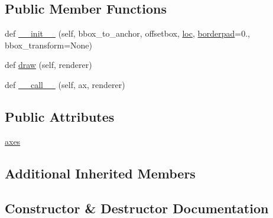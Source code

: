 \subsection*{Public Member Functions}
\begin{DoxyCompactItemize}
\item 
def \hyperlink{classaxes__grid1_1_1inset__locator_1_1AnchoredLocatorBase_a8a4b20f4feabb4c4cab5f5c4af129f5b}{\+\_\+\+\_\+init\+\_\+\+\_\+} (self, bbox\+\_\+to\+\_\+anchor, offsetbox, \hyperlink{classmatplotlib_1_1offsetbox_1_1AnchoredOffsetbox_acff8512cc529c0576658d3d3102f68ad}{loc}, \hyperlink{classmatplotlib_1_1offsetbox_1_1AnchoredOffsetbox_a50d24143d0fabb11a481b3d85b62a19a}{borderpad}=0., bbox\+\_\+transform=None)
\item 
def \hyperlink{classaxes__grid1_1_1inset__locator_1_1AnchoredLocatorBase_a1c0106e18dd39cf786a4911cb407b18c}{draw} (self, renderer)
\item 
def \hyperlink{classaxes__grid1_1_1inset__locator_1_1AnchoredLocatorBase_ac8934f7451fe584d9049a892213ebe2d}{\+\_\+\+\_\+call\+\_\+\+\_\+} (self, ax, renderer)
\end{DoxyCompactItemize}
\subsection*{Public Attributes}
\begin{DoxyCompactItemize}
\item 
\hyperlink{classaxes__grid1_1_1inset__locator_1_1AnchoredLocatorBase_a23ab77b0ced871503d9b10c9d24bb685}{axes}
\end{DoxyCompactItemize}
\subsection*{Additional Inherited Members}


\subsection{Constructor \& Destructor Documentation}
\mbox{\label{classaxes__grid1_1_1inset__locator_1_1AnchoredLocatorBase_a8a4b20f4feabb4c4cab5f5c4af129f5b}} 
